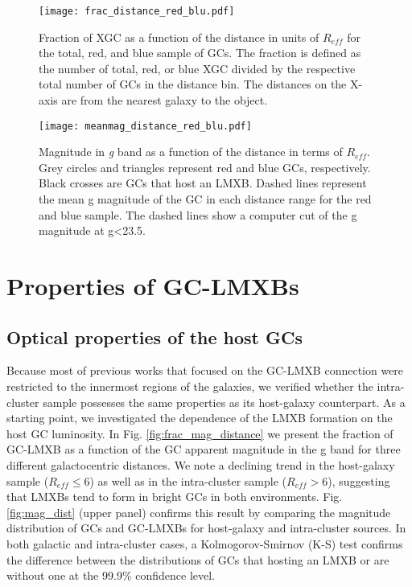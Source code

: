 \documentclass{aa}
\begin{document}
 \begin{figure}
    \centering
     \texttt{[image: frac\_distance\_red\_blu.pdf]}
    
    \caption{Fraction of XGC as a function of the distance in units of $R_{eff}$ for the total, red, and blue sample of GCs. The fraction is defined as the number of total, red, or blue XGC divided by the respective total number of GCs in the distance bin. The distances on the X-axis are from the nearest galaxy to the object.} 
    \label{fig:fraction}
\end{figure}

\begin{figure}
    \centering
     \texttt{[image: meanmag\_distance\_red\_blu.pdf]}
    
    \caption{Magnitude in \textit{g} band as a function of the distance in terms of $R_{eff}$. Grey circles and triangles represent red and blue GCs, respectively. Black crosses are GCs that host an LMXB. Dashed lines represent the mean g magnitude of the GC in each distance range for the red and blue sample. The dashed lines show a computer cut of the g magnitude at g<23.5.}
    \label{fig:meanmag}
\end{figure}



\section{Properties of GC-LMXBs}

\subsection{Optical properties of the host GCs}
Because most of previous works that focused on the GC-LMXB connection were restricted to the innermost regions of the galaxies, we verified whether the intra-cluster sample possesses the same properties as its host-galaxy counterpart. As a starting point, we investigated the dependence of the LMXB formation on the host GC luminosity. In Fig. \ref{fig:frac_mag_distance} we present the fraction of GC-LMXB as a function of the GC apparent magnitude in the g band for three different galactocentric distances. We note a declining trend in the host-galaxy sample ($R_{eff} \leq 6$) as well as in the intra-cluster sample ($R_{eff}>6$), suggesting that LMXBs tend to form in bright GCs in both environments. Fig. \ref{fig:mag_dist} (upper panel) confirms this result by comparing the magnitude distribution of GCs and GC-LMXBs for host-galaxy and intra-cluster sources. In both galactic and intra-cluster cases, a Kolmogorov-Smirnov (K-S) test confirms the difference between the distributions of GCs that hosting an LMXB or are without one at the 99.9\% confidence level.
\end{document}
